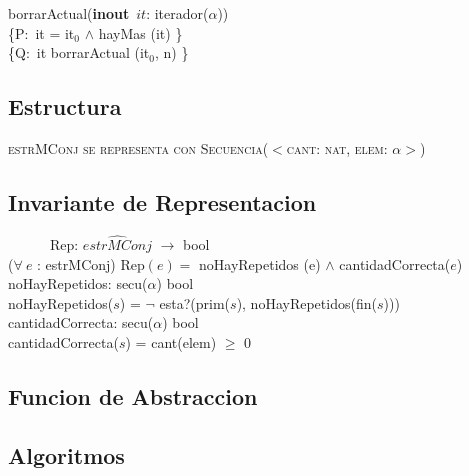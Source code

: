 \documentclass[a4paper,10pt]{article}
\newcommand{\sombrero}{\widehat}
\begin{document}
\noindent borrarActual(\textbf{inout}\ $it$: iterador($\alpha$)) \ \ \ \ \ \\
\indent \{P:\ it = it$_0$ $\wedge$ hayMas (it) \}  \\
\indent \{Q:\ it \igobs borrarActual (it$_0$, n) \}\\

\newpage
\subsection{Estructura}

    \noindent \textsc{estrMConj se representa con Secuencia($<$cant: nat, elem: $\alpha>$)}


\subsection{Invariante de Representacion}

    \indent \ \ \ \ \ \ Rep: $\sombrero{estrMConj}$ $\rightarrow$ bool \\
    
($\forall\ e$ : estrMConj) Rep$(e) =$ noHayRepetidos (e) $\wedge$ cantidadCorrecta($e$) \\

noHayRepetidos: secu($\alpha$) \en bool\\
	\indent noHayRepetidos($s$) = $\neg$ esta?(prim($s$), noHayRepetidos(fin($s$)))  \\    
	
cantidadCorrecta: secu($\alpha$) \en bool\\
	\indent cantidadCorrecta($s$) = cant(elem) $\geq$ 0 \\


\subsection{Funcion de Abstraccion}

\subsection{Algoritmos}
\end{document}
